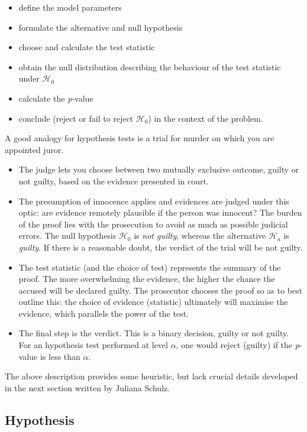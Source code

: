 \documentclass[
  11pt,
  letterpaper,
]{book}
\providecommand{\tightlist}{%
  \setlength{\itemsep}{0pt}\setlength{\parskip}{0pt}}
\theoremstyle{definition}
\theoremstyle{definition}
\theoremstyle{definition}
\theoremstyle{remark}
\begin{document}
\begin{itemize}
\tightlist
\item
  define the model parameters
\item
  formulate the alternative and null hypothesis
\item
  choose and calculate the test statistic
\item
  obtain the null distribution describing the behaviour of the test statistic under \(\mathscr{H}_0\)
\item
  calculate the \emph{p}-value
\item
  conclude (reject or fail to reject \(\mathscr{H}_0\)) in the context of the problem.
\end{itemize}

A good analogy for hypothesis tests is a trial for murder on which you are appointed juror.

\begin{itemize}
\tightlist
\item
  The judge lets you choose between two mutually exclusive outcome, guilty or not guilty, based on the evidence presented in court.
\item
  The presumption of innocence applies and evidences are judged under this optic: are evidence remotely plausible if the person was innocent? The burden of the proof lies with the prosecution to avoid as much as possible judicial errors. The null hypothesis \(\mathscr{H}_0\) is \emph{not guilty}, whereas the alternative \(\mathscr{H}_a\) is \emph{guilty}. If there is a reasonable doubt, the verdict of the trial will be not guilty.
\item
  The test statistic (and the choice of test) represents the summary of the proof. The more overwhelming the evidence, the higher the chance the accused will be declared guilty. The prosecutor chooses the proof so as to best outline this: the choice of evidence (statistic) ultimately will maximise the evidence, which parallels the power of the test.
\item
  The final step is the verdict. This is a binary decision, guilty or not guilty. For an hypothesis test performed at level \(\alpha\), one would reject (guilty) if the \emph{p}-value is less than \(\alpha\).
\end{itemize}

The above description provides some heuristic, but lack crucial details developed in the next section written by Juliana Schulz.

\hypertarget{hypothesis}{%
\subsection{Hypothesis}\label{hypothesis}}
\end{document}
